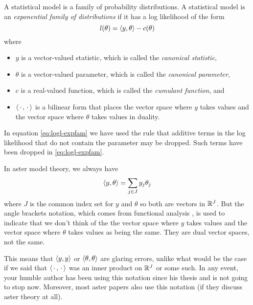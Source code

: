 A statistical model is a family of probability distributions.
A statistical model is an \emph{exponential family of distributions} if it has
a log likelihood of the form
\begin{equation} \label{eq:logl-expfam}
   l(\theta) = \langle y, \theta \rangle - c(\theta)
\end{equation}
where
\begin{itemize}
\item $y$ is a vector-valued statistic, which is called
   the \emph{canonical statistic},
\item $\theta$ is a vector-valued parameter, which is called
   the \emph{canonical parameter},
\item $c$ is a real-valued function, which is called
   the \emph{cumulant function}, and
\item $\langle \,\cdot\,, \,\cdot\, \rangle$ is a bilinear form that places
   the vector space where $y$ takes values and the vector
   space where $\theta$ takes values in duality.
\end{itemize}

In equation \eqref{eq:logl-expfam} we have used the rule that additive terms
in the log likelihood that do not contain the parameter may be dropped.
Such terms have been dropped in \eqref{eq:logl-expfam}.

In aster model theory, we always have
$$
   \langle y, \theta \rangle = \sum_{j \in J} y_j \theta_j
$$
where $J$ is the common index set for $y$ and $\theta$
so both are vectors in $\mathbb{R}^J$.  But the angle brackets notation,
which comes from functional analysis \citep{rudin}, is used to indicate
that we don't think of the the vector space where $y$ takes values
and the vector space where $\theta$ takes values as being the same.
They are dual vector spaces, not the same.

This means that $\langle y, y \rangle$ or $\langle \theta, \theta \rangle$ are
glaring errors, unlike what would be the case if we said that
$\langle \,\cdot\,, \,\cdot\, \rangle$ was an inner product on $\mathbb{R}^J$ or some such.
In any event, your humble author has been using this notation since his
thesis \citep{geyer-thesis} and is not going to stop now.
Moreover, most aster papers also use this notation (if they discuss
aster theory at all).

